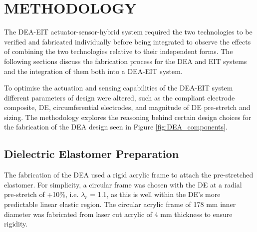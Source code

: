  
	\section{METHODOLOGY} %
	\label{sec:method}
	The DEA-EIT actuator-sensor-hybrid system required the two technologies to be verified and fabricated individually before being integrated to observe the effects of combining the two technologies relative to their independent forms. The following sections discuss the fabrication process for the DEA and EIT systems and the integration of them both into a DEA-EIT system.
	
	To optimise the actuation and sensing capabilities of the DEA-EIT system different parameters of design were altered, such as the compliant electrode composite, DE, circumferential electrodes, and magnitude of DE pre-stretch and sizing. The methodology explores the reasoning behind certain design choices for the fabrication of the DEA design seen in Figure \ref{fig:DEA_components}.
	
	
	\subsection{Dielectric Elastomer Preparation}
	\label{subsec:de_fab}
	The fabrication of the DEA used a rigid acrylic frame to attach the pre-stretched elastomer. For simplicity, a circular frame was chosen with the DE at a radial pre-stretch of +10\%, i.e. $\lambda_r$ = 1.1, as this is well within the DE's more predictable linear elastic region. The circular acrylic frame of 178 mm inner diameter was fabricated from laser cut acrylic of 4 mm thickness to ensure rigidity.
	
